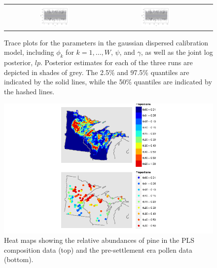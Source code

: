 \begin{figure}
\begin{tabular}{ccc}
  \includegraphics[page=14,width=0.3\textwidth]{figures/cal_trace.png} &
  \includegraphics[page=15,width=0.3\textwidth]{figures/cal_trace.png} 
\end{tabular}
\caption{Trace plots for the parameters in the gaussian dispersed
  calibration model, including $\phi_k$ for $k=1, \ldots, W$, $\psi$,
  and $\gamma$, as well as the joint log posterior,
  $\textit{lp}$. Posterior estimates for each of the three runs are
  depicted in shades of grey. The 2.5\% and 97.5\% quantiles are
  indicated by the solid lines, while the 50\% quantiles are indicated
  by the hashed lines.}
\label{fig:trace}
\end{figure}

\begin{figure}
\centering
\includegraphics[width=7in]{figures/maps_compare_PINE.png}
\caption{Heat maps showing the relative abundances of pine in the PLS
  composition data (top) and the pre-settlement era pollen data
  (bottom).}
\label{fig:compare_maps_PINE}
\end{figure}

